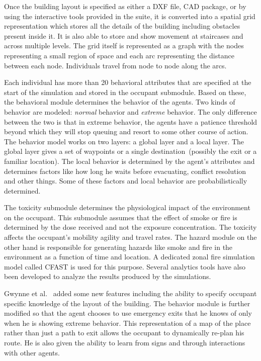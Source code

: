 Once the building layout is specified as either a DXF file, CAD package, or by using the interactive tools provided in the suite, it is converted into a spatial grid representation which stores all the details of the building including obstacles present inside it. It is also able to store and show movement at staircases and across multiple levels. The grid itself is represented as a graph with the nodes representing a small region of space and each arc representing the distance between each node. Individuals travel from node to node along the arcs.

Each individual has more than 20 behavioral attributes that are specified at the start of the simulation and stored in the occupant submodule. Based on these, the behavioral module determines the behavior of the agents. Two kinds of behavior are modeled: \emph{normal} behavior and \emph{extreme} behavior. The only difference between the two is that in extreme behavior, the agents have a patience threshold beyond which they will stop queuing and resort to some other course of action. The behavior model works on two layers: a global layer and a local layer. The global layer gives a set of waypoints or a single destination~(possibly the exit or a familiar location). The local behavior is determined by the agent's attributes and determines factors like how long he waits before evacuating, conflict resolution and other things. Some of these factors and local behavior are probabilistically determined.

The toxicity submodule determines the physiological impact of the environment on the occupant. This submodule assumes that the effect of smoke or fire is determined by the dose received and not the exposure concentration. The toxicity affects the occupant's mobility agility and travel rates. The hazard module on the other hand is responsible for generating hazards like smoke and fire in the environment as a function of time and location. A dedicated zonal fire simulation model called CFAST is used for this purpose. Several analytics tools have also been developed to analyze the results produced by the simulations.

Gwynne et al.~\cite{Gwynne:2001te} added some new features including the ability to specify occupant specific knowledge of the layout of the building. The behavior module is further modified so that the agent chooses to use emergency exits that he knows of only when he is showing extreme behavior. This representation of a map of the place rather than just a path to exit allows the occupant to dynamically re-plan his route. He is also given the ability to learn from signs and through interactions with other agents.

